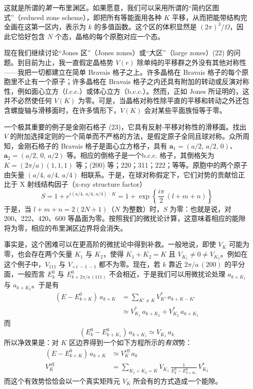 
这就是所谓的\emph{第一}布里渊区。如果愿意，我们可以采用所谓的“简约区图式”（reduced zone scheme），即把所有等能面用各种 $K$ 平移，从而把能带结构完全画在这第一区内，表示为 $k$ 的多值函数。这个区的体积显然是 $(2\pi)^3/\Omega$，因此它恰好包含 $N$ 个态，晶格的每个原胞对应一个态。

现在我们继续讨论“Jones 区”（Jones zones）或“大区”（large zones）(22) 的问题。到目前为止，我一直假定晶格势 $V(r)$ 除单纯的平移群之外没有其他对称性——我把一切都建立在简单 Bravais 格子之上。许多晶格在 Bravais 格子的每个原胞里不止有一个原子；许多晶格在 Bravais 格子之内还具有附加的转动或反演对称性，例如面心立方（f.c.c.）或体心立方（b.c.c.）。然而，正如 Jones 所证明的，这并不必然使任何 $V(K)$ 为零。可是，当晶格对称性除平直的平移和转动之外还包含螺旋轴与滑移面时，在许多情形下，$V(K)$ 会对某些平面族恒等于零。

一个极其重要的例子是金刚石格子 (23)，它具有反射-平移对称性的滑移面。找出 $V$ 的附加选择定则的一个简单而不严格的方法，是假定原子全同且球对称。众所周知，金刚石格子的 Bravais 格子是面心立方格子，具有 $\mathbf{a}_1=(a/2,\,a/2,\,0)$、$\mathbf{a}_2=(a/2,\,0,\,a/2)$ 等。相应的倒格子是一个b.c.c. 格子，其倒格矢为 $K=(2\pi/a)(1,1,1)$ 等；(200) 等；220；311；222；等等。原胞中的两个原子由矢量 $(a/4,\,a/4,\,a/4)$ 相联系。于是，在球对称假定下，它们对势的贡献恰正比于 X 射线结构因子（x-ray structure factor）
\begin{equation*}
S = 1 + e^{i(a/4,\,a/4,\,a/4)\,\cdot\,K} = 1 + \exp\left\{\frac{i\pi}{2}\,(l+m+n)\right\}
\end{equation*}
于是，当 $l+m+n=2(2N+1)$（$N$ 为整数）时，$S$ 为零：也就是说，对 200、222、420、600 等晶面为零。按照我们的微扰论计算，这意味着相应的能隙将为零，相应的布里渊区边界将会消失。

事实是，这个困难可以在更高阶的微扰论中得到补救。一般地说，即使 $V_K$ 可能为零，也会存在两个矢量 $K_1$ 与 $K_2$，使得 $K_1+K_2=K$ 且 $V_{K_1}\ne 0\ne V_{K_2}$。例如在这个例子中，$V_{111}$ 与 $V_{+1\,-1\,-1}$ 都不为零。现在，若 $k$ 靠近 $2\pi/a\,(200)$ 的平分面，一般而言 $E^0_k$ 与 $E^0_{k+2\pi/a\,(111)}$ 不会相近，于是我们可以用微扰论处理 $a_{k+K_1}$ 与 $a_{k+K_2}$。于是有
\begin{align*}
(E - E^0_{k+K})\,a_{k+K} &= \sum_{K'\ne K} V_{K'}^{*}\,a_{k+K-K'} \\
&\simeq V_{K_1}^{*}\,a_{k+K_2} + V_{K_2}^{*}\,a_{k+K_1}
\end{align*}
而
\begin{equation*}
(E^0_k - E^0_{k+K_1})\,a_{k+K_1} \simeq V_{K_1}\,a_k
\end{equation*}
所以净效果是：对 $K$ 区边界得到一个如下方程所示的\emph{有效}势：
\begin{align*}
(E - E^0_{k+K})\,a_{k+K} &\simeq V_{K}^{\mathrm{eff}}\,a_k \\
V_{K}^{\mathrm{eff}} &= \sum_{K_1+K_2=K} V_{K_1}\,\frac{1}{E^0_k - E^0_{k+K_1}}\,V_{K_2}^{*}
\end{align*}
而这个有效势恰恰会以一个真实矩阵元 $V_K$ 所会有的方式造成一个能隙。

